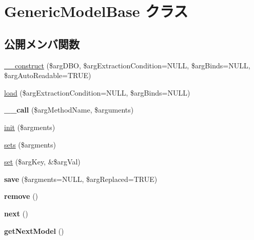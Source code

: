 \hypertarget{class_generic_model_base}{}\section{Generic\+Model\+Base クラス}
\label{class_generic_model_base}
\subsection*{公開メンバ関数}
\begin{DoxyCompactItemize}
\item 
\hyperlink{class_generic_model_base_a921ba840cc34f2bbc74fdadb1913b13a}{\+\_\+\+\_\+construct} (\$arg\+D\+B\+O, \$arg\+Extraction\+Condition=N\+U\+L\+L, \$arg\+Binds=N\+U\+L\+L, \$arg\+Auto\+Readable=T\+R\+U\+E)
\item 
\hyperlink{class_generic_model_base_a7504cf3ea18e7d7e6d876ae75c1e42dc}{load} (\$arg\+Extraction\+Condition=N\+U\+L\+L, \$arg\+Binds=N\+U\+L\+L)
\item 
\hypertarget{class_generic_model_base_a3c11553e30e83aa483ce11e7632d791b}{}{\bfseries \+\_\+\+\_\+call} (\$arg\+Method\+Name, \$arguments)\label{class_generic_model_base_a3c11553e30e83aa483ce11e7632d791b}

\item 
\hyperlink{class_generic_model_base_a54e2533b58033559d0e28461146d8873}{init} (\$argments)
\item 
\hyperlink{class_generic_model_base_a2726b42512a61a9a1fd3ca926caa6649}{sets} (\$argments)
\item 
\hyperlink{class_generic_model_base_a91025863a1f755ed1bf42231cf9ef599}{set} (\$arg\+Key, \&\$arg\+Val)
\item 
\hypertarget{class_generic_model_base_a344f1c44100c719b3c79c6f7fe6e6014}{}{\bfseries save} (\$argments=N\+U\+L\+L, \$arg\+Replaced=T\+R\+U\+E)\label{class_generic_model_base_a344f1c44100c719b3c79c6f7fe6e6014}

\item 
\hypertarget{class_generic_model_base_ac48d7b1812621d3e48ba5d4b280fce23}{}{\bfseries remove} ()\label{class_generic_model_base_ac48d7b1812621d3e48ba5d4b280fce23}

\item 
\hypertarget{class_generic_model_base_aad9cf01a8d4947543d2db2acd3e7a4b9}{}{\bfseries next} ()\label{class_generic_model_base_aad9cf01a8d4947543d2db2acd3e7a4b9}

\item 
\hypertarget{class_generic_model_base_ab94e7ec418c1c3a416cd8eb47cfd467b}{}{\bfseries get\+Next\+Model} ()\label{class_generic_model_base_ab94e7ec418c1c3a416cd8eb47cfd467b}


\end{DoxyCompactItemize}
